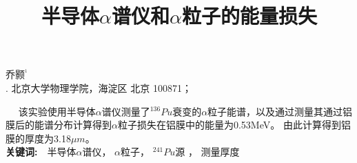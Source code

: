 \documentclass[a4paper,10.0pt,twoside]{npr}
\begin{document}
\setcounter{page}{001}%
\begin{center}
\title{%
\xiaoerhao \bf  %
半导体$\alpha$谱仪和$\alpha$粒子的能量损失\\[-5mm]}
\maketitle
\large \fs
乔颢$^{^1}$\\[2mm]

\xiaowu {}. 北京大学物理学院，海淀区 北京 100871；\\[4mm]

 

\parbox{158mm} {
~~\fs
该实验使用半导体$\alpha$谱仪测量了$^{136}Pu$衰变的$\alpha$粒子能谱，以及通过测量其通过铝膜后的能谱分布计算得到$\alpha$粒子损失在铝膜中的能量为0.53MeV。 由此计算得到铝膜的厚度为3.18$\mu m$。\\

{\bf 关键词:}~~\fs 半导体$\alpha$谱仪， $\alpha$粒子， $^{241}Pu$源 ， 测量厚度}\\
\end{center}
\vspace{5mm}
\setcounter{section}{0}
\end{document}

